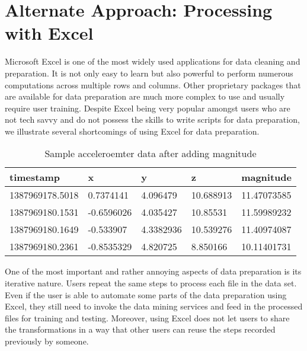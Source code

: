 \section{Alternate Approach: Processing with Excel}

Microsoft Excel is one of the most widely used applications for data cleaning and preparation. It is not only easy to learn but also powerful to perform numerous computations across multiple rows and columns. Other proprietary packages that are available for data preparation are much more complex to use and usually require  user training. Despite Excel being very popular amongst users who are not tech savvy and do not possess the skills to write scripts for data preparation, we illustrate several shortcomings of using Excel for data preparation. 

\begin{table}[h]
	\centering	
	\caption{Sample acceleroemter data after adding magnitude\label{tab:sample_data_acce}}
  	\begin{tabular}{ | p{2cm} | p{1.3cm} | p{1cm} | p{1cm} | p{1.5cm} | }
    	\hline
	    \textbf{timestamp} & \textbf{x} & \textbf{y} & \textbf{z} & \textbf{magnitude} \\ \hline
		1387969178.5018 & 0.7374141 & 4.096479 & 10.688913 & 11.47073585 \\ \hline
		1387969180.1531 & -0.6596026 & 4.035427 & 10.85531 & 11.59989232 \\ \hline
		1387969180.1649 & -0.533907 & 4.3382936 & 10.539276 & 11.40974087 \\ \hline
		1387969180.2361 & -0.8535329 & 4.820725 & 8.850166 & 10.11401731 \\
	    \hline
  	\end{tabular}
\end{table}

One of the most important and rather annoying aspects of data preparation is its iterative nature. Users repeat the same steps to process each file in the data set. Even if the user is able to automate some parts of the data preparation using Excel, they still need to invoke the data mining services and feed in the processed files for training and testing. Moreover, using Excel does not let users to share the transformations in a way that other users can reuse the steps recorded previously by someone. 

